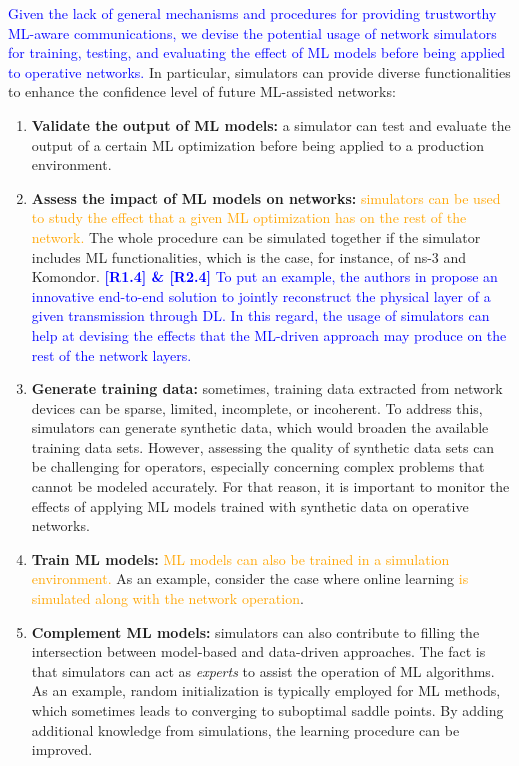 \documentclass[journal]{IEEEtran}
\begin{document}
	\textcolor{blue}{Given the lack of general mechanisms and procedures for providing trustworthy ML-aware communications, we devise the potential usage of network simulators for training, testing, and evaluating the effect of ML models before being applied to operative networks.} In particular, simulators can provide diverse functionalities to enhance the confidence level of future ML-assisted networks: 
	\begin{enumerate}
		\item \textbf{Validate the output of ML models:} a simulator can test and evaluate the output of a certain ML optimization before being applied to a production environment. 
		\item \textbf{Assess the impact of ML models on networks:} \textcolor{orange}{simulators can be used to study the effect that a given ML optimization has on the rest of the network.} The whole procedure can be simulated together if the simulator includes ML functionalities, which is the case, for instance, of ns-3 and Komondor. \textcolor{blue}{\textbf{[R1.4] \& [R2.4]} To put an example, the authors in \cite{survey6} propose an innovative end-to-end solution to jointly reconstruct the physical layer of a given transmission through DL. In this regard, the usage of simulators can help at devising the effects that the ML-driven approach may produce on the rest of the network layers.}	
		\item \textbf{Generate training data:} sometimes, training data extracted from network devices can be sparse, limited, incomplete, or incoherent. To address this, simulators can generate synthetic data, which would broaden the available training data sets. However, assessing the quality of synthetic data sets can be challenging for operators, especially concerning complex problems that cannot be modeled accurately. For that reason, it is important to monitor the effects of applying ML models trained with synthetic data on operative networks.
		\item \textbf{Train ML models:} \textcolor{orange}{ML models can also be trained in a simulation environment.} As an example, consider the case where online learning \textcolor{orange}{is simulated along with the network operation}. 
		\item \textbf{Complement ML models:} simulators can also contribute to filling the intersection between model-based and data-driven approaches. The fact is that simulators can act as \textit{experts} to assist the operation of ML algorithms. As an example, random initialization is typically employed for ML methods, which sometimes leads to converging to suboptimal saddle points. By adding additional knowledge from simulations, the learning procedure can be improved.
	\end{enumerate}
			
\end{document}
